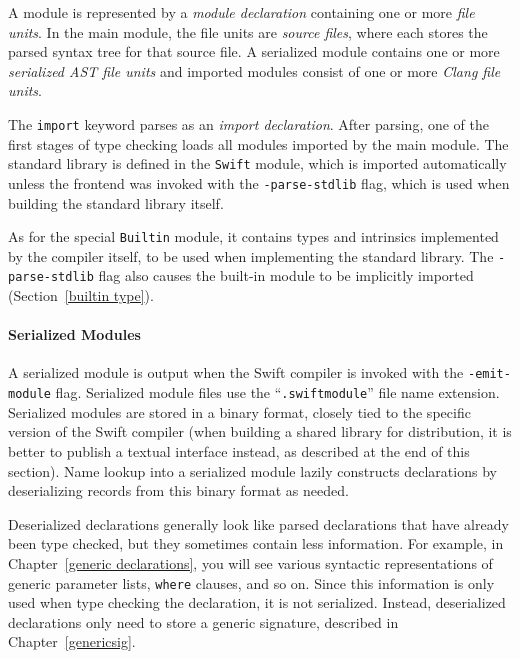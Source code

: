 \documentclass[a4paper,headsepline,bibliography=totoc,toc=flat,fleqn,twoside=semi]{scrbook}
\theoremstyle{definition}
\theoremstyle{definition}
\theoremstyle{definition}
\begin{document}
A module is represented by a \emph{module declaration} containing one or more \emph{file units}. In the main module, the file units are \emph{source files}, where each stores the parsed syntax tree for that source file. A serialized module contains one or more \emph{serialized AST file units} and imported modules consist of one or more \emph{Clang file units}.

The \texttt{import} keyword parses as an \emph{import declaration}. After parsing, one of the first stages of type checking loads all modules imported by the main module. The standard library is defined in the \texttt{Swift} module, which is imported automatically unless the frontend was invoked with the \texttt{-parse-stdlib} flag, which is used when building the standard library itself.

As for the special \texttt{Builtin} module, it contains types and intrinsics implemented by the compiler itself, to be used when implementing the standard library. The \texttt{-parse-stdlib} flag also causes the built-in module to be implicitly imported (Section~\ref{builtin type}).

\paragraph{Serialized Modules} A serialized module is output when the Swift compiler is invoked with the \texttt{-emit-module} flag. Serialized module files use the ``\texttt{.swiftmodule}'' file name extension. Serialized modules are stored in a binary format, closely tied to the specific version of the Swift compiler (when building a shared library for distribution, it is better to publish a textual interface instead, as described at the end of this section). Name lookup into a serialized module lazily constructs declarations by deserializing records from this binary format as needed.

Deserialized declarations generally look like parsed declarations that have already been type checked, but they sometimes contain less information. For example, in Chapter~\ref{generic declarations}, you will see various syntactic representations of generic parameter lists, \texttt{where} clauses, and so on. Since this information is only used when type checking the declaration, it is not serialized. Instead, deserialized declarations only need to store a generic signature, described in Chapter~\ref{genericsig}.
\end{document}
